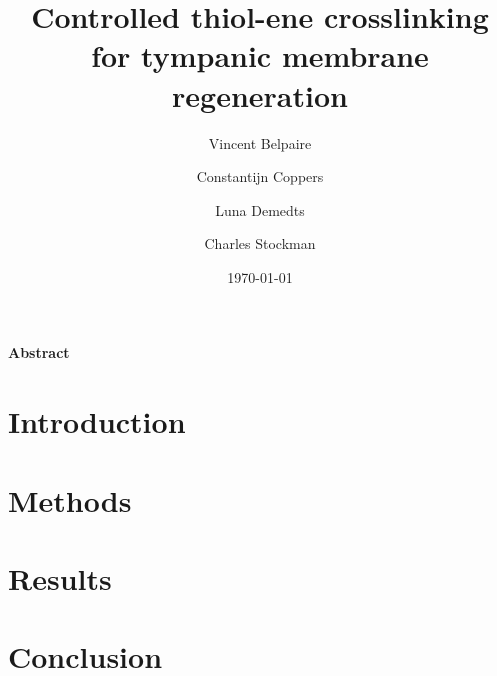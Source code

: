 \documentclass[dutch, a4paper, 11pt]{article}
\title{Controlled thiol-ene crosslinking for tympanic membrane regeneration}
\author[1]{Vincent Belpaire}
\author[1]{Constantijn Coppers}
\author[1]{Luna Demedts}
\author[1]{Charles Stockman}
\affil[1]{\small Biomedical Engineering, Faculty of Architecture and Engineering, Ghent University}
\date{\today}
\begin{document}



\begin{tcolorbox}[colframe=ugent_blue, colback=ugent_blue!10, enhanced jigsaw, boxrule=0.5pt]
{\bf Abstract}\\
\lipsum[1- 2]
\end{tcolorbox}



\begin{multicols}{2}  %

    \section{Introduction}

        
        
        
        
        

    \section{Methods}

    \section{Results}

    \section{Conclusion}

\end{multicols}
\end{document}
